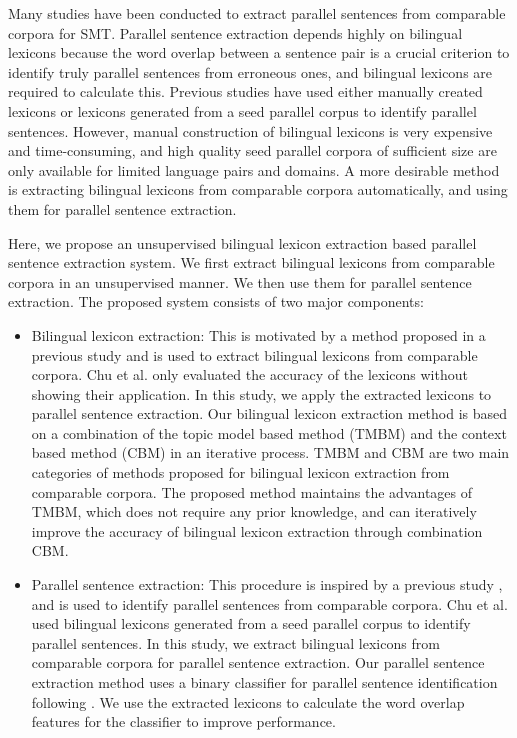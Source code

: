\documentclass[english]{jnlp_1.4}
\begin{document}
Many studies have been conducted to extract parallel sentences from 
comparable corpora for SMT. Parallel sentence extraction depends highly on bilingual
lexicons because the word overlap between a sentence pair is a crucial
criterion to identify truly parallel sentences from erroneous ones, and bilingual 
lexicons are required to calculate this. Previous studies have used either manually created lexicons 
\cite{utiyama-isahara:2003:ACL,fung-cheung:2004:COLING,Adafre:2006:EACL,Lu:2010:LREC}
or lexicons generated from a seed parallel corpus 
\cite{zhao:2002:IEEE,Munteanu:2005,tillmann:2009:Short,smith-quirk-toutanova:2010:NAACLHLT,Abdul-RaufS11,Stefanescu:2012:EAMT,Stefanescu:2013:CICLing,ling-EtAl:2013:ACL2013}
to identify parallel sentences.
However, manual construction of bilingual lexicons is very expensive and
time-consuming, and high quality seed parallel corpora of sufficient size are only available for
limited language pairs and domains. A more desirable method is extracting 
bilingual lexicons from comparable corpora automatically, and using them for parallel sentence extraction.

Here, we propose an unsupervised bilingual lexicon extraction based
parallel sentence extraction system. We first extract bilingual lexicons from comparable 
corpora in an unsupervised manner. We then use them for parallel sentence extraction. 
The proposed system consists of two major components:
\begin{itemize} 
\item Bilingual lexicon extraction: This is motivated by a method proposed in a previous study \cite{chu-nakazawa-kurohashi:2014:CICLing}
  and is used to extract bilingual lexicons from comparable corpora. Chu et al. \citeyear{chu-nakazawa-kurohashi:2014:CICLing} only evaluated 
  the accuracy of the lexicons without showing their application. In this study, we apply the 
  extracted lexicons to parallel sentence extraction. Our bilingual lexicon extraction method is based on a 
  combination of the topic model based method (TMBM) \cite{vulic-desmet-moens:2011:ACL-HLT2011} and 
  the context based method (CBM) \cite{rapp:1999:ACL} in an iterative process. TMBM and CBM are two main categories of methods 
  proposed for bilingual lexicon extraction from comparable corpora.
  The proposed method maintains the advantages of TMBM, which does not require any prior knowledge, and can iteratively 
  improve the accuracy of bilingual lexicon extraction through combination CBM.
\item Parallel sentence extraction: This procedure is inspired by a previous study \cite{chu:2014:LREC}, 
  and is used to identify parallel sentences from comparable corpora. Chu et al. \citeyear{chu:2014:LREC} used
  bilingual lexicons generated from a seed parallel corpus to identify parallel sentences. In 
  this study, we extract bilingual lexicons from comparable corpora for parallel sentence extraction. 
  Our parallel sentence extraction method uses a binary classifier for parallel sentence identification following 
  \cite{Munteanu:2005}. We use the extracted lexicons to calculate the word overlap features for 
  the classifier to improve performance.
\end{itemize} 
\end{document}
